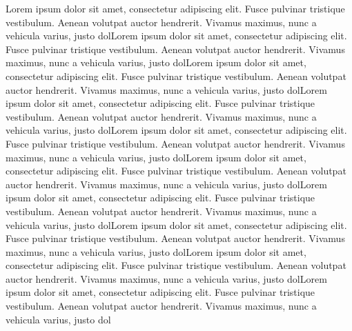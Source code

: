 Lorem ipsum dolor sit amet, consectetur adipiscing elit. Fusce pulvinar tristique vestibulum. Aenean volutpat auctor hendrerit. Vivamus maximus, nunc a vehicula varius, justo dolLorem ipsum dolor sit amet, consectetur adipiscing elit. Fusce pulvinar tristique vestibulum. Aenean volutpat auctor hendrerit. Vivamus maximus, nunc a vehicula varius, justo dolLorem ipsum dolor sit amet, consectetur adipiscing elit. Fusce pulvinar tristique vestibulum. Aenean volutpat auctor hendrerit. Vivamus maximus, nunc a vehicula varius, justo dolLorem ipsum dolor sit amet, consectetur adipiscing elit. Fusce pulvinar tristique vestibulum. Aenean volutpat auctor hendrerit. Vivamus maximus, nunc a vehicula varius, justo dolLorem ipsum dolor sit amet, consectetur adipiscing elit. Fusce pulvinar tristique vestibulum. Aenean volutpat auctor hendrerit. Vivamus maximus, nunc a vehicula varius, justo dolLorem ipsum dolor sit amet, consectetur adipiscing elit. Fusce pulvinar tristique vestibulum. Aenean volutpat auctor hendrerit. Vivamus maximus, nunc a vehicula varius, justo dolLorem ipsum dolor sit amet, consectetur adipiscing elit. Fusce pulvinar tristique vestibulum. Aenean volutpat auctor hendrerit. Vivamus maximus, nunc a vehicula varius, justo dolLorem ipsum dolor sit amet, consectetur adipiscing elit. Fusce pulvinar tristique vestibulum. Aenean volutpat auctor hendrerit. Vivamus maximus, nunc a vehicula varius, justo dolLorem ipsum dolor sit amet, consectetur adipiscing elit. Fusce pulvinar tristique vestibulum. Aenean volutpat auctor hendrerit. Vivamus maximus, nunc a vehicula varius, justo dolLorem ipsum dolor sit amet, consectetur adipiscing elit. Fusce pulvinar tristique vestibulum. Aenean volutpat auctor hendrerit. Vivamus maximus, nunc a vehicula varius, justo dol
